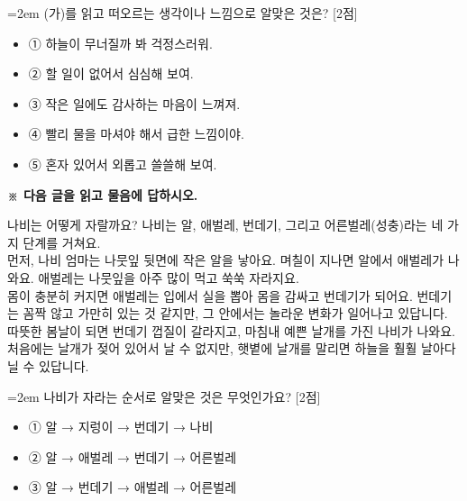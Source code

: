 \documentclass[12pt,a4paper]{article}
\newcommand{\qnum}[1]{%
  \tikz[baseline=(num.base)]{%
    \node[circle, fill=numCircle, text=white, inner sep=0pt,
          minimum size=18pt, font=\small\bfseries] (num) {#1};%
  }%
}
\newcommand{\pts}[1]{%
  \hfill\textcolor{ptsBadge}{[#1점]}%
}
\begin{document}
\vspace{4mm}
\begin{samepage}
{\hangindent=2em
\qnum{16}\enspace (가)를 읽고 떠오르는 생각이나 느낌으로 알맞은 것은? \pts{2}
\par}

\vspace{3mm}
\begin{itemize}[leftmargin=2.5em, labelsep=0.3em, label={}, itemsep=4pt, parsep=1pt, topsep=0pt]
  \item ① 하늘이 무너질까 봐 걱정스러워.
  \item ② 할 일이 없어서 심심해 보여.
  \item ③ 작은 일에도 감사하는 마음이 느껴져.
  \item ④ 빨리 물을 마셔야 해서 급한 느낌이야.
  \item ⑤ 혼자 있어서 외롭고 쓸쓸해 보여.
\end{itemize}
\end{samepage}

\vspace{4mm}
{\small\textbf{※ 다음 글을 읽고 물음에 답하시오.}}
\vspace{2mm}
\begin{tcolorbox}[passage]
나비는 어떻게 자랄까요? 나비는 알, 애벌레, 번데기, 그리고 어른벌레(성충)라는 네 가지 단계를 거쳐요. \\{}
먼저, 나비 엄마는 나뭇잎 뒷면에 작은 알을 낳아요. 며칠이 지나면 알에서 애벌레가 나와요. 애벌레는 나뭇잎을 아주 많이 먹고 쑥쑥 자라지요. \\{}
몸이 충분히 커지면 애벌레는 입에서 실을 뽑아 몸을 감싸고 번데기가 되어요. 번데기는 꼼짝 않고 가만히 있는 것 같지만, 그 안에서는 놀라운 변화가 일어나고 있답니다. \\{}
따뜻한 봄날이 되면 번데기 껍질이 갈라지고, 마침내 예쁜 날개를 가진 나비가 나와요. 처음에는 날개가 젖어 있어서 날 수 없지만, 햇볕에 날개를 말리면 하늘을 훨훨 날아다닐 수 있답니다.
\end{tcolorbox}
\vspace{3mm}
\begin{samepage}
{\hangindent=2em
\qnum{17}\enspace 나비가 자라는 순서로 알맞은 것은 무엇인가요? \pts{2}
\par}

\vspace{3mm}
\begin{itemize}[leftmargin=2.5em, labelsep=0.3em, label={}, itemsep=4pt, parsep=1pt, topsep=0pt]
  \item ① 알 → 지렁이 → 번데기 → 나비
  \item ② 알 → 애벌레 → 번데기 → 어른벌레
  \item ③ 알 → 번데기 → 애벌레 → 어른벌레
\end{itemize}
\end{samepage}
\end{document}
